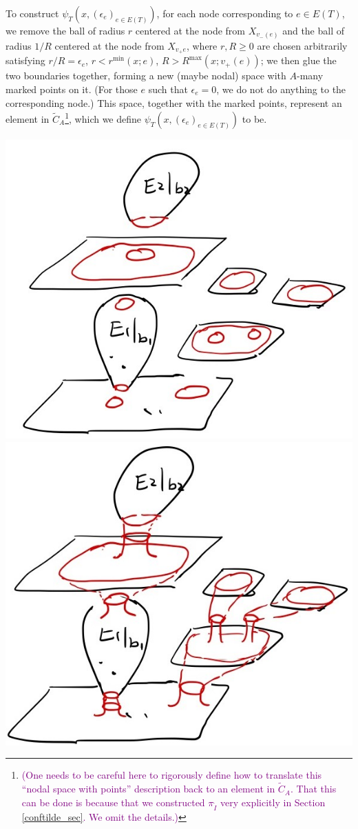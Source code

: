 \documentclass[11pt]{article}
\theoremstyle{definition}
\theoremstyle{remark}
\def\wt#1{\widetilde{#1}}
\def\mr#1{{\mathring{#1}}}
\def\cmt#1{\textcolor{purple}{(#1)}}
\begin{document}
To construct $\psi_T(x,(\epsilon_e)_{e\in E(T)})$, 
for each node corresponding to $e\in E(T)$, we remove the ball of radius $r$ centered at the node from $X_{v_-(e)}$ and the ball of radius $1/R$ centered at the node from $X_{v_+e}$, where $r,R\ge0$ are chosen arbitrarily satisfying $r/R=\epsilon_e$, $r<r^{\min}(x;e)$, $R>R^{\max}(x;v_+(e))$; 
we then glue the two boundaries together, forming a new (maybe nodal) space with $A$-many marked points on it.
(For those $e$ such that $\epsilon_e=0$, we do not do anything to the corresponding node.) 
This space, together with the marked points, represent an element in $\wt{C}_A$\footnote{
\cmt{One needs to be careful here to rigorously define how to translate this ``nodal space with points'' description back to an element in $\wt{C}_A$. That this can be done is because that we constructed $\pi_{\mr{I}}$ very explicitly in Section \ref{conftilde_sec}. We omit the details.}
}, which we define $\psi_T(x,(\epsilon_e)_{e\in E(T)})$ to be. 

\includegraphics[scale=0.15]{xcut_fig}
\hspace{3cm}
\includegraphics[scale=0.15]{xglue_fig}
\end{document}
